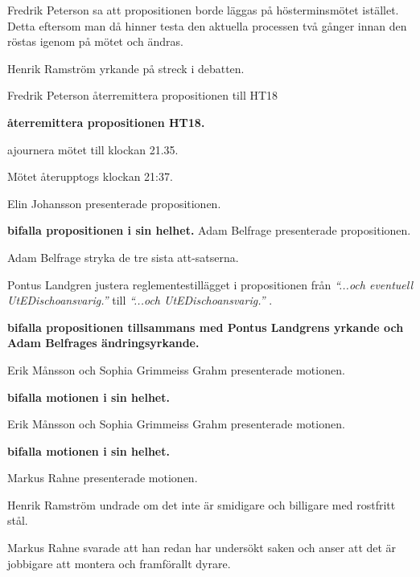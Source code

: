 \documentclass[10pt]{article}
\begin{document}
\begin{paragrafer}
\begin{paragrafer}
		Fredrik Peterson sa att propositionen borde läggas på hösterminsmötet istället. Detta eftersom man då hinner testa den aktuella processen två gånger innan den röstas igenom på mötet och ändras.

		Henrik Ramström yrkande på streck i debatten.

		\Mbaby

		Fredrik Peterson \ypa återremittera propositionen till HT18

		\textbf{\Mba återremittera propositionen HT18.}

		\Mba ajournera mötet till klockan 21.35.

		Mötet återupptogs klockan 21:37.

		Elin Johansson presenterade propositionen.

		\textbf{\Mba bifalla propositionen i sin helhet.}
		Adam Belfrage presenterade propositionen.

		Adam Belfrage \ypa stryka de tre sista att-satserna.

		Pontus Landgren \ypa justera reglementestillägget i propositionen från \emph{ ``...och eventuell UtEDischoansvarig.'' } till \emph{ ``...och UtEDischoansvarig.'' }.

		\textbf{\Mba bifalla propositionen tillsammans med Pontus Landgrens yrkande och Adam Belfrages ändringsyrkande.}
	\end{paragrafer}

	\begin{paragrafer}

		Erik Månsson och Sophia Grimmeiss Grahm presenterade motionen.

		\textbf{\Mba bifalla motionen i sin helhet.}

		Erik Månsson och Sophia Grimmeiss Grahm presenterade motionen.

		\textbf{\Mba bifalla motionen i sin helhet.}

		Markus Rahne presenterade motionen.

		Henrik Ramström undrade om det inte är smidigare och billigare med rostfritt stål.

		Markus Rahne svarade att han redan har undersökt saken och anser att det är jobbigare att montera och framförallt dyrare.


\end{paragrafer}
\end{paragrafer}
\end{document}
